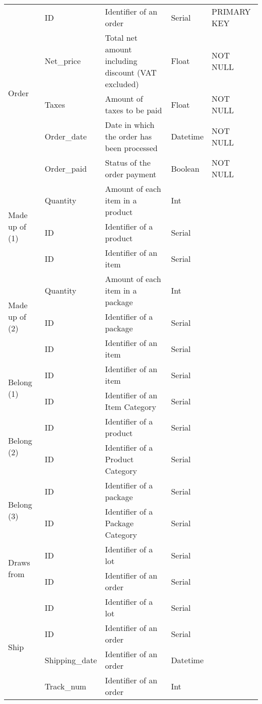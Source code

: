\begin{longtable}{|p{}|p{} |p{}|p{}|p{} |}
\multirow{5}{*}{Order} & ID & Identifier of an order & Serial & PRIMARY KEY \\\cline{2-5}
& Net\_price &  Total net amount including discount (VAT excluded) & Float & NOT NULL \\\cline{2-5}
& Taxes & Amount of taxes to be paid & Float & NOT NULL \\\cline{2-5}
& Order\_date & Date in which the order has been processed & Datetime & NOT NULL \\\cline{2-5}
& Order\_paid & Status of the order payment & Boolean & NOT NULL \\\hline



\multirow{3}{*}{Made up of (1)} & Quantity & Amount of each item in a product & Int &  \\\cline{2-5}
& ID & Identifier of a product & Serial & \\\cline{2-5}
& ID & Identifier of an item & Serial & \\\hline

\multirow{3}{*}{Made up of (2)} & Quantity & Amount of each item in a package & Int &  \\\cline{2-5}
& ID & Identifier of a package & Serial & \\\cline{2-5}
& ID & Identifier of an item & Serial & \\\hline


\multirow{2}{*}{Belong (1)} & ID & Identifier of an item & Serial & \\\cline{2-5}
& ID & Identifier of an Item Category & Serial & \\\hline

\multirow{2}{*}{Belong (2)} & ID & Identifier of a product & Serial & \\\cline{2-5}
& ID & Identifier of a Product Category & Serial & \\\hline

\multirow{2}{*}{Belong (3)} & ID & Identifier of a package & Serial & \\\cline{2-5}
& ID & Identifier of a Package Category & Serial & \\\hline

\multirow{2}{*}{Draws from} & ID & Identifier of a lot & Serial & \\\cline{2-5}
& ID & Identifier of an order & Serial & \\\hline

\multirow{4}{*}{Ship} & ID & Identifier of a lot & Serial & \\\cline{2-5}
& ID & Identifier of an order & Serial & \\\cline{2-5}
& Shipping\_date & Identifier of an order & Datetime & \\\cline{2-5}
& Track\_num & Identifier of an order & Int & \\\cline{2-5}




\end{longtable}
